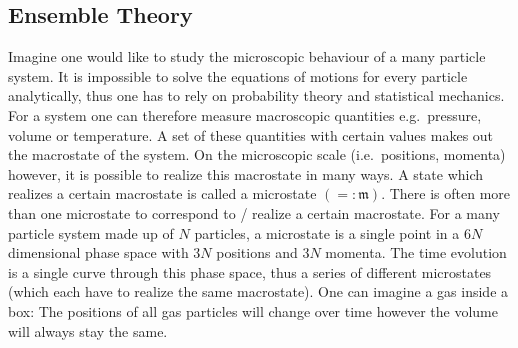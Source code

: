 \documentclass[a4paper,10pt]{article}
\numberwithin{equation}{section}
\begin{document}
\begin{multicols}{2}

\section{Ensemble Theory}
Imagine one would like to study the microscopic behaviour of a many particle system.
It is impossible to solve the equations of motions for every particle analytically, thus one has to rely on probability theory and statistical mechanics.
For a system one can therefore measure macroscopic quantities e.g.\ pressure, volume or temperature.
A set of these quantities with certain values makes out the macrostate of the system.
On the microscopic scale (i.e.\ positions, momenta) however, it is possible to realize this macrostate in many ways.
A state which realizes a certain macrostate is called a microstate $\left(=:\mathfrak{m}\right)$.
There is often more than one microstate to correspond to / realize a certain macrostate.
For a many particle system made up of $N$ particles, a microstate is a single point in a $6N$ dimensional phase space with $3N$ positions and $3N$ momenta.
The time evolution is a single curve through this phase space, thus a series of different microstates (which each have to realize the same macrostate).
One can imagine a gas inside a box: The positions of all gas particles will change over time however the volume will always stay the same.


\end{multicols}
\end{document}
